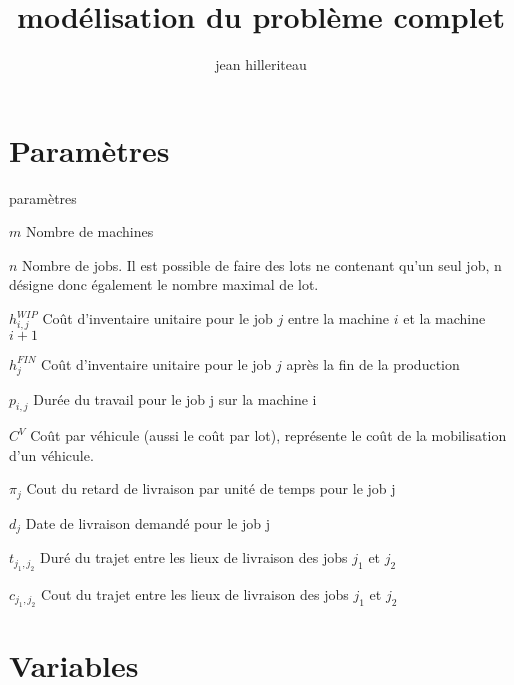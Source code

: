 \documentclass{article}
\begin{document}
    \title{modélisation du problème complet}
    
    \author{jean hilleriteau}
    \maketitle
    
    \section*{Paramètres}
        \begin{labeling}{paramètres}
        
            \item 
                [$m$] 
                Nombre de machines
            \item 
                [$n$] 
                Nombre de jobs. 
                Il est possible de faire des lots ne contenant qu’un seul job, 
                n désigne donc également le nombre maximal de lot.
            \item 
                [$h_{i,j}^{WIP}$] 
                Coût d’inventaire unitaire pour le job $j$ entre la machine $i$ et la machine $i+1$
            \item 
                [$h_j^{FIN}$] 
                Coût d’inventaire unitaire pour le job $j$ après la fin de la production
            \item 
                [$p_{i,j}$] 
                Durée du travail pour le job j sur la machine i
            \item 
                [$C^V$] 
                Coût par véhicule (aussi le coût par lot), représente le coût de la mobilisation d’un véhicule.
            \item
                [$\pi_j$]
                Cout du retard de livraison par unité de temps pour le job j
            \item
                [$d_j$]
                Date de livraison demandé pour le job j
            \item
                [$t_{j_1,j_2}$]
                Duré du trajet entre les lieux de livraison des jobs $j_1$ et $j_2$
            \item
                [$c_{j_1,j_2}$]
                Cout du trajet entre les lieux de livraison des jobs $j_1$ et $j_2$

            
        \end{labeling}
    
    
    \section*{Variables}
    
\end{document}
